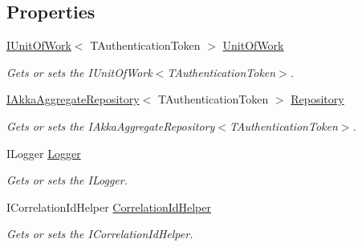 \subsection*{Properties}
\begin{DoxyCompactItemize}
\item 
\hyperlink{interfaceCqrs_1_1Domain_1_1IUnitOfWork}{I\+Unit\+Of\+Work}$<$ T\+Authentication\+Token $>$ \hyperlink{classCqrs_1_1Akka_1_1Domain_1_1AkkaAggregateRoot_a58b79dc3e0d837e58d95f5cfeb2da9a1_a58b79dc3e0d837e58d95f5cfeb2da9a1}{Unit\+Of\+Work}
\begin{DoxyCompactList}\small\item\em Gets or sets the I\+Unit\+Of\+Work$<$\+T\+Authentication\+Token$>$. \end{DoxyCompactList}\item 
\hyperlink{interfaceCqrs_1_1Akka_1_1Domain_1_1IAkkaAggregateRepository}{I\+Akka\+Aggregate\+Repository}$<$ T\+Authentication\+Token $>$ \hyperlink{classCqrs_1_1Akka_1_1Domain_1_1AkkaAggregateRoot_ae15ae65ca994c5ab932d9817a9f7cb7d_ae15ae65ca994c5ab932d9817a9f7cb7d}{Repository}
\begin{DoxyCompactList}\small\item\em Gets or sets the I\+Akka\+Aggregate\+Repository$<$\+T\+Authentication\+Token$>$. \end{DoxyCompactList}\item 
I\+Logger \hyperlink{classCqrs_1_1Akka_1_1Domain_1_1AkkaAggregateRoot_a685737862246db856bf3eb94345fca3f_a685737862246db856bf3eb94345fca3f}{Logger}
\begin{DoxyCompactList}\small\item\em Gets or sets the I\+Logger. \end{DoxyCompactList}\item 
I\+Correlation\+Id\+Helper \hyperlink{classCqrs_1_1Akka_1_1Domain_1_1AkkaAggregateRoot_ae1460c9574d7d7b1cb9de2848ae7102e_ae1460c9574d7d7b1cb9de2848ae7102e}{Correlation\+Id\+Helper}
\begin{DoxyCompactList}\small\item\em Gets or sets the I\+Correlation\+Id\+Helper. \end{DoxyCompactList}\item 

\end{DoxyCompactItemize}
